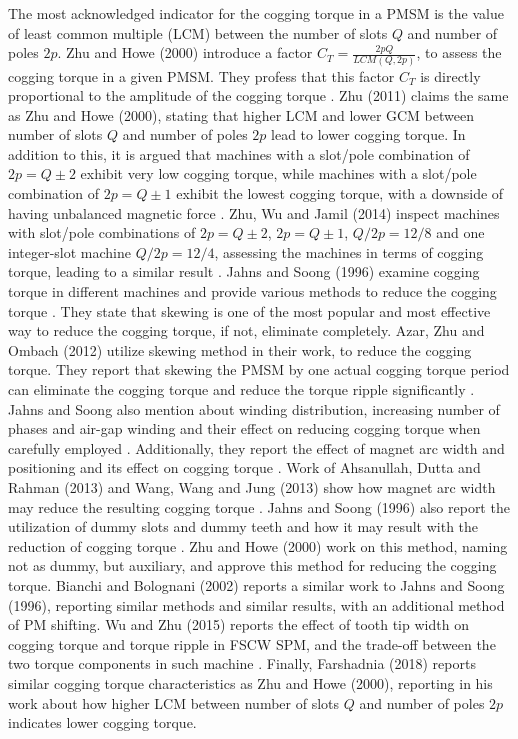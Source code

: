 \documentclass [a4 paper, 11pt, titlepage] {article}
\begin{document}
	The most acknowledged indicator for the cogging torque in a PMSM is the value of least common multiple (LCM) between the number of slots $Q$ and number of poles $2p$. Zhu and Howe (2000) introduce a factor $C_T=\frac{2pQ}{LCM(Q,2p)}$, to assess the cogging torque in a given PMSM. They profess that this factor $C_T$ is directly proportional to the amplitude of the cogging torque \cite{zhu_influence_2000}. Zhu (2011) claims the same as Zhu and Howe (2000), stating that higher LCM and lower GCM between number of slots $Q$ and number of poles $2p$ lead to lower cogging torque. In addition to this, it is argued that machines with a slot/pole combination of $2p=Q\pm2$ exhibit very low cogging torque, while machines with a slot/pole combination of $2p=Q\pm1$ exhibit the lowest cogging torque, with a downside of having unbalanced magnetic force \cite{masmoudi_fractional_2011}. Zhu, Wu and Jamil (2014) inspect machines with slot/pole combinations of $2p=Q\pm2$, $2p=Q\pm1$, $Q/2p=12/8$ and one integer-slot machine $Q/2p=12/4$, assessing the machines in terms of cogging torque, leading to a similar result \cite{zhu_influence_2014}. Jahns and Soong (1996) examine cogging torque in different machines and provide various methods to reduce the cogging torque \cite{jahns_pulsating_1996}. They state that skewing is one of the most popular and most effective way to reduce the cogging torque, if not, eliminate completely. Azar, Zhu and Ombach (2012) utilize skewing method in their work, to reduce the cogging torque. They report that skewing the PMSM by one actual cogging torque period can eliminate the cogging torque and reduce the torque ripple significantly \cite{azar_influence_2012}. Jahns and Soong also mention about winding distribution, increasing number of phases and air-gap winding and their effect on reducing cogging torque when carefully employed \cite{jahns_pulsating_1996}. Additionally, they report the effect of magnet arc width and positioning and its effect on cogging torque \cite{jahns_pulsating_1996}. Work of Ahsanullah, Dutta and Rahman (2013) and Wang, Wang and Jung (2013) show how magnet arc width may reduce the resulting cogging torque \cite{wang_cogging_2013} \cite{ahsanullah_design_2013}. Jahns and Soong (1996) also report the utilization of dummy slots and dummy teeth and how it may result with the reduction of cogging torque \cite{jahns_pulsating_1996}. Zhu and Howe (2000) work on this method, naming not as dummy, but auxiliary, and approve this method for reducing the cogging torque. Bianchi and Bolognani (2002) reports a similar work to Jahns and Soong (1996), reporting similar methods and similar results, with an additional method of PM shifting. Wu and Zhu (2015) reports the effect of tooth tip width on cogging torque and torque ripple in FSCW SPM, and the trade-off between the two torque components in such machine \cite{wu_design_2015}. Finally, Farshadnia (2018) reports similar cogging torque characteristics as Zhu and Howe (2000), reporting in his work about how higher LCM between number of slots $Q$ and number of poles $2p$ indicates lower cogging torque.
	
\end{document}
